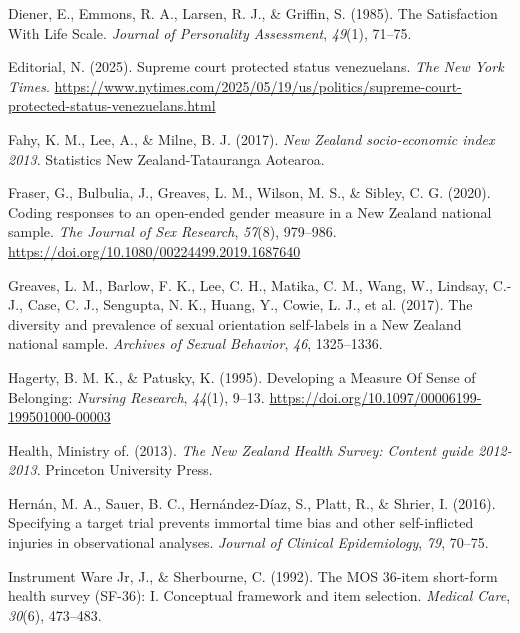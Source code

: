 \documentclass[
  single column]{article}
\newlength{\cslhangindent}
\newenvironment{CSLReferences}[2] %
 {\begin{list}{}{%
  \setlength{\itemindent}{0pt}
  \setlength{\leftmargin}{0pt}
  \setlength{\parsep}{0pt}
  \ifodd #1
   \setlength{\leftmargin}{\cslhangindent}
   \setlength{\itemindent}{-1\cslhangindent}
  \fi
  \setlength{\itemsep}{#2\baselineskip}}}
 {\end{list}}
\begin{document}
\begin{CSLReferences}{1}{0}
Diener, E., Emmons, R. A., Larsen, R. J., \& Griffin, S. (1985). The
Satisfaction With Life Scale. \emph{Journal of Personality Assessment},
\emph{49}(1), 71--75.

Editorial, N. (2025). Supreme court protected status venezuelans.
\emph{The New York Times}.
\url{https://www.nytimes.com/2025/05/19/us/politics/supreme-court-protected-status-venezuelans.html}

Fahy, K. M., Lee, A., \& Milne, B. J. (2017). \emph{{N}ew {Z}ealand
socio-economic index 2013}. Statistics New Zealand-Tatauranga Aotearoa.

Fraser, G., Bulbulia, J., Greaves, L. M., Wilson, M. S., \& Sibley, C.
G. (2020). Coding responses to an open-ended gender measure in a {N}ew
{Z}ealand national sample. \emph{The Journal of Sex Research},
\emph{57}(8), 979--986.
\url{https://doi.org/10.1080/00224499.2019.1687640}

Greaves, L. M., Barlow, F. K., Lee, C. H., Matika, C. M., Wang, W.,
Lindsay, C.-J., Case, C. J., Sengupta, N. K., Huang, Y., Cowie, L. J.,
et al. (2017). The diversity and prevalence of sexual orientation
self-labels in a {N}ew {Z}ealand national sample. \emph{Archives of
Sexual Behavior}, \emph{46}, 1325--1336.

Hagerty, B. M. K., \& Patusky, K. (1995). Developing a Measure Of Sense
of Belonging: \emph{Nursing Research}, \emph{44}(1), 9--13.
\url{https://doi.org/10.1097/00006199-199501000-00003}

Health, Ministry of. (2013). \emph{The {N}ew {Z}ealand {H}ealth
{S}urvey: Content guide 2012-2013}. Princeton University Press.

Hernán, M. A., Sauer, B. C., Hernández-Díaz, S., Platt, R., \& Shrier,
I. (2016). Specifying a target trial prevents immortal time bias and
other self-inflicted injuries in observational analyses. \emph{Journal
of Clinical Epidemiology}, \emph{79}, 70--75.

Instrument Ware Jr, J., \& Sherbourne, C. (1992). The MOS 36-item
short-form health survey (SF-36): I. Conceptual framework and item
selection. \emph{Medical Care}, \emph{30}(6), 473--483.


\end{CSLReferences}
\end{document}
